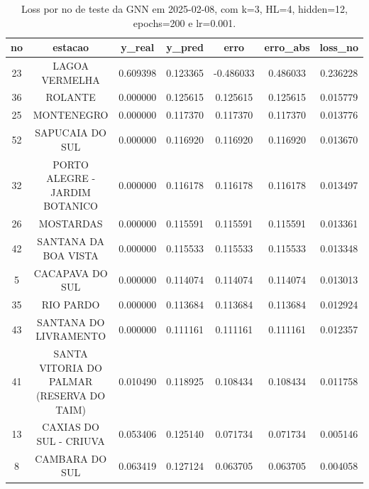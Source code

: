 \begin{table}[h]
\centering
\caption{Loss por no de teste da GNN em 2025-02-08, com k=3, HL=4, hidden=12, epochs=200 e lr=0.001.}
\label{tab:gnn_loss_k3_hl4_h12_e200_d20250208}
\begin{tabular}{ccccccc}
\toprule
no & estacao & y\_real & y\_pred & erro & erro\_abs & loss\_no \\
\midrule
23 & LAGOA VERMELHA & 0.609398 & 0.123365 & -0.486033 & 0.486033 & 0.236228 \\
36 & ROLANTE & 0.000000 & 0.125615 & 0.125615 & 0.125615 & 0.015779 \\
25 & MONTENEGRO & 0.000000 & 0.117370 & 0.117370 & 0.117370 & 0.013776 \\
52 & SAPUCAIA DO SUL & 0.000000 & 0.116920 & 0.116920 & 0.116920 & 0.013670 \\
32 & PORTO ALEGRE - JARDIM BOTANICO & 0.000000 & 0.116178 & 0.116178 & 0.116178 & 0.013497 \\
26 & MOSTARDAS & 0.000000 & 0.115591 & 0.115591 & 0.115591 & 0.013361 \\
42 & SANTANA DA BOA VISTA & 0.000000 & 0.115533 & 0.115533 & 0.115533 & 0.013348 \\
5 & CACAPAVA DO SUL & 0.000000 & 0.114074 & 0.114074 & 0.114074 & 0.013013 \\
35 & RIO PARDO & 0.000000 & 0.113684 & 0.113684 & 0.113684 & 0.012924 \\
43 & SANTANA DO LIVRAMENTO & 0.000000 & 0.111161 & 0.111161 & 0.111161 & 0.012357 \\
41 & SANTA VITORIA DO PALMAR (RESERVA DO TAIM) & 0.010490 & 0.118925 & 0.108434 & 0.108434 & 0.011758 \\
13 & CAXIAS DO SUL - CRIUVA & 0.053406 & 0.125140 & 0.071734 & 0.071734 & 0.005146 \\
8 & CAMBARA DO SUL & 0.063419 & 0.127124 & 0.063705 & 0.063705 & 0.004058 \\
\bottomrule
\end{tabular}
\end{table}

